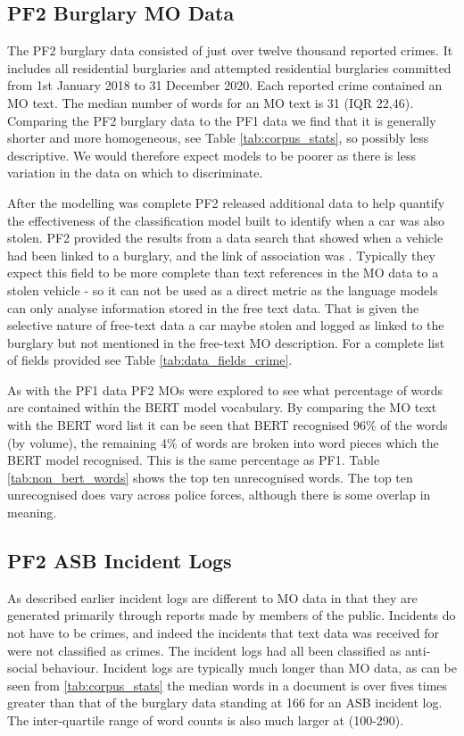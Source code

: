 \subsection{PF2 Burglary MO Data} The PF2 burglary data consisted of just over twelve thousand reported crimes. It includes all residential burglaries and attempted residential burglaries committed from 1st January 2018 to 31 December 2020. Each reported crime contained an MO text. The median number of words for an MO text is 31 (IQR 22,46). Comparing the PF2 burglary data to the PF1 data we find that it is generally shorter and more homogeneous, see Table \ref{tab:corpus_stats}, so possibly less descriptive. We would therefore expect models to be poorer as there is less variation in the data on which to discriminate. 

After the modelling was complete PF2 released additional data to help quantify the effectiveness of the classification model built to identify when a car was also stolen. PF2 provided the results from a data search that showed when a vehicle had been linked to a burglary, and the link of association was . Typically they expect this field to be more complete than text references in the MO data to a stolen vehicle - so it can not be used as a direct metric as the language models can only analyse information stored in the free text data. That is given the selective nature of free-text data a car maybe stolen and logged as linked to the burglary but not mentioned in the free-text MO description. For a complete list of fields provided see Table \ref{tab:data_fields_crime}.

As with the PF1 data PF2 MOs were explored to see what percentage of words are contained within the BERT model vocabulary. By comparing the MO text with the BERT word list it can be seen that BERT recognised 96\% of the words (by volume), the remaining 4\% of words are broken into word pieces which the BERT model recognised. This is the same percentage as PF1.  Table \ref{tab:non_bert_words} shows the top ten unrecognised words. The top ten unrecognised does vary across police forces, although there is some overlap in meaning. 


\subsection{PF2 ASB Incident Logs}As described earlier incident logs are different to MO data in that they are generated primarily through reports made by members of the public. Incidents do not have to be crimes, and indeed the incidents that text data was received for were not classified as crimes. The incident logs had all been classified as anti-social behaviour. Incident logs are typically much longer than MO data, as can be seen from \ref{tab:corpus_stats} the median words in a document is over fives times greater than that of the burglary data standing at 166 for an ASB incident log. The inter-quartile range of word counts is also much larger at (100-290).  

